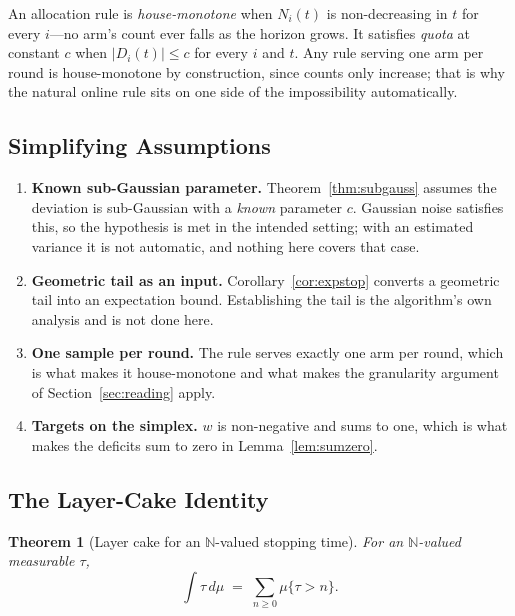 \documentclass[conference]{IEEEtran}
\newtheorem{theorem}{Theorem}
\theoremstyle{definition}
\begin{document}
An allocation rule is \emph{house-monotone} when $N_{i}(t)$ is non-decreasing in $t$ for every
$i$---no arm's count ever falls as the horizon grows. It satisfies \emph{quota} at constant
$c$ when $|D_{i}(t)|\le c$ for every $i$ and $t$. Any rule serving one arm per round is
house-monotone by construction, since counts only increase; that is why the natural online
rule sits on one side of the impossibility automatically.

\subsection{Simplifying Assumptions}

\begin{enumerate}
\item[1)] \textbf{Known sub-Gaussian parameter.} Theorem~\ref{thm:subgauss} assumes the
deviation is sub-Gaussian with a \emph{known} parameter $c$. Gaussian noise satisfies this, so
the hypothesis is met in the intended setting; with an estimated variance it is not automatic,
and nothing here covers that case.

\item[2)] \textbf{Geometric tail as an input.} Corollary~\ref{cor:expstop} converts a
geometric tail into an expectation bound. Establishing the tail is the algorithm's own
analysis and is not done here.

\item[3)] \textbf{One sample per round.} The rule serves exactly one arm per round, which is
what makes it house-monotone and what makes the granularity argument of
Section~\ref{sec:reading} apply.

\item[4)] \textbf{Targets on the simplex.} $w$ is non-negative and sums to one, which is what
makes the deficits sum to zero in Lemma~\ref{lem:sumzero}.
\end{enumerate}

\subsection{The Layer-Cake Identity}
\label{sec:layercake}

\begin{theorem}[Layer cake for an $\mathbb{N}$-valued stopping time]
\label{thm:layercake}
For an $\mathbb{N}$-valued measurable $\tau$,
\begin{equation}
\int \tau \,d\mu\;=\;\sum_{n\geq 0}\mu\{\tau>n\}.
\label{eq:layercake}
\end{equation}
\end{theorem}
\end{document}
